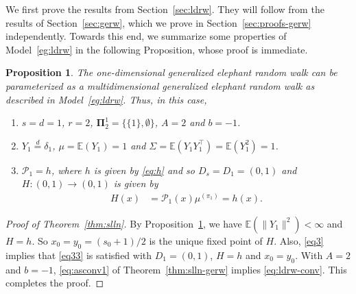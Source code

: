 \documentclass[12pt]{amsart}
\theoremstyle{plain}
\newtheorem{proposition}[theorem]{Proposition}
\theoremstyle{remark}
\numberwithin{equation}{section}
\begin{document}
We first prove the results from Section~\ref{sec:ldrw}. They will follow from the results of Section~\ref{sec:gerw}, which we prove in Section~\ref{sec:proofs-gerw} independently. Towards this end, we summarize some properties of Model~\ref{eg:ldrw} in the following Proposition, whose proof is immediate.

\begin{proposition}\label{prop:ldrw}
    The one-dimensional generalized elephant random walk can be parameterized as a multidimensional generalized elephant random walk as described in Model~\ref{eg:ldrw}. 
    Thus, in this case, 
    \begin{enumerate}
        \item[a)] $s = d = 1$, $r = 2$, $\boldsymbol{\Pi}^1_2 = \{\{1\},\emptyset\}$, $A = 2$ and $b = -1$.
        \item[b)] ${Y}_1 \stackrel{d}{=} \delta_{{1}}$, %
        $\mu = \mathbb{E}\left({Y}_1\right) = 1$ and $\Sigma = \mathbb{E}\left(Y_1Y_1^{\top}\right) = \mathbb{E}\left(Y_1^2\right) = 1$.
        \item[c)] ${\mathcal{P}_1} = h$, where $h$ is given by \eqref{eq:h} and so $D_s = D_1 = (0,1)$ and ${H}: (0,1) \to (0,1)$ is given by
\begin{align*}
{H}(x) &= \mathcal{P}_1({x}){\mu}^{(\pi_1)} = h(x).
\end{align*} 
\end{enumerate}    
\end{proposition}


\begin{proof}[Proof of Theorem~\ref{thm:slln}]
By Proposition~\ref{prop:ldrw}, we have $\mathbb{E}\left(\|{Y}_1\|^{2}\right) < \infty$ and ${H} = h$. So ${x}_0 = y_0 = (s_0+1)/2$ is the unique fixed point of ${H}$. Also, \eqref{eq3} implies that \eqref{eq33} is satisfied with $D_1 = (0,1)$, $H = h$ and $x_0 = y_0$. With $A = 2$ and $b = -1$, \eqref{eq:asconv1} of Theorem~\ref{thm:slln-gerw} implies \eqref{eq:ldrw-conv}. This completes the proof.
\end{proof}
\end{document}
